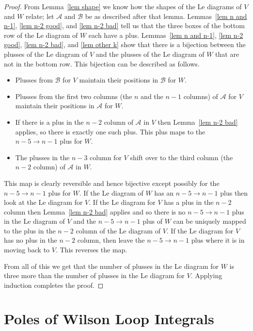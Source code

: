 \documentclass[11pt]{article}
\theoremstyle{remark}
\theoremstyle{definition}
\begin{document}
\begin{proof}
  {}From Lemma~\ref{lem shape} we know how the shapes of the Le diagrams of $V$ and $W$ relate; let $\mathcal{A}$ and $\mathcal{B}$ be as described after that lemma.  Lemmas~\ref{lem n and n-1}, \ref{lem n-2 good}, and \ref{lem n-2 bad} tell us that the three boxes of the bottom row of the Le diagram of $W$ each have a plus.  Lemmas~\ref{lem n and n-1}, \ref{lem n-2 good}, \ref{lem n-2 bad}, and \ref{lem other k} show that there is a bijection between the plusses of the Le diagram of $V$ and the plusses of the Le diagram of $W$ that are not in the bottom row.  This bijection can be described as follows.
  \begin{itemize}
  \item Plusses from $\mathcal{B}$ for $V$ maintain their positions in $\mathcal{B}$ for $W$.
  \item Plusses from the first two columns (the $n$ and the $n-1$ columns) of $\mathcal{A}$ for $V$ maintain their positions in $\mathcal{A}$ for $W$.
  \item If there is a plus in the $n-2$ column of $\mathcal{A}$ in $V$ then Lemma~\ref{lem n-2 bad} applies, so there is exactly one such plus.  This plus maps to the $n-5\rightarrow n-1$ plus for $W$.
  \item The plusses in the $n-3$ column for $V$ shift over to the third column (the $n-2$ column) of $\mathcal{A}$ in $W$.
  \end{itemize}
  This map is clearly reversible and hence bijective except possibly for the $n-5\rightarrow n-1$ plus for $W$.   If the Le diagram of $W$ has an $n-5\rightarrow n-1$ plus then look at the Le diagram for $V$.  If the Le diagram for $V$ has a plus in the $n-2$ column then Lemma~\ref{lem n-2 bad} applies and so there is no $n-5\rightarrow n-1$ plus in the Le diagram of $V$ and the $n-5\rightarrow n-1$ plus of $W$ can be uniquely mapped to the plus in the $n-2$ column of the Le diagram of $V$.  If the Le diagram for $V$ has no plus in the $n-2$ column, then leave the $n-5\rightarrow n-1$ plus where it is in moving back to $V$.  This reverses the map.

  From all of this we get that the number of plusses in the Le diagram for $W$ is three more than the number of plusses in the Le diagram for $V$.  Applying induction completes the proof.
\end{proof}


\section{Poles of Wilson Loop Integrals}
\end{document}
